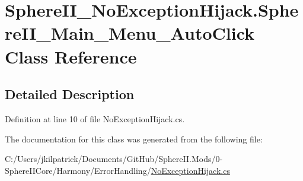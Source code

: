 \hypertarget{class_sphere_i_i___no_exception_hijack_1_1_sphere_i_i___main___menu___auto_click}{}\section{Sphere\+I\+I\+\_\+\+No\+Exception\+Hijack.\+Sphere\+I\+I\+\_\+\+Main\+\_\+\+Menu\+\_\+\+Auto\+Click Class Reference}
\label{class_sphere_i_i___no_exception_hijack_1_1_sphere_i_i___main___menu___auto_click}


\subsection{Detailed Description}


Definition at line 10 of file No\+Exception\+Hijack.\+cs.



The documentation for this class was generated from the following file\+:\begin{DoxyCompactItemize}
\item 
C\+:/\+Users/jkilpatrick/\+Documents/\+Git\+Hub/\+Sphere\+I\+I.\+Mods/0-\/\+Sphere\+I\+I\+Core/\+Harmony/\+Error\+Handling/\mbox{\hyperlink{_no_exception_hijack_8cs}{No\+Exception\+Hijack.\+cs}}\end{DoxyCompactItemize}
